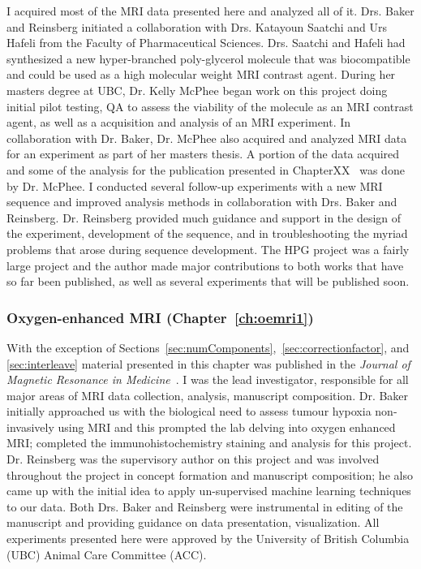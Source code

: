 I acquired most of the MRI data presented here and analyzed all of it.
Drs. Baker and Reinsberg initiated a collaboration with Drs. Katayoun Saatchi and Urs Hafeli from the Faculty of Pharmaceutical Sciences.
Drs. Saatchi and Hafeli had synthesized a new hyper-branched poly-glycerol molecule that was biocompatible and could be used as a high molecular weight MRI contrast agent.
During her masters degree at UBC, Dr. Kelly McPhee began work on this project doing initial pilot testing, QA to assess the viability of the molecule as an MRI contrast agent, as well as a acquisition and analysis of an MRI experiment.
In collaboration with Dr. Baker, Dr. McPhee also acquired and analyzed MRI data for an experiment as part of her masters thesis. 
A portion of the data acquired and some of the analysis for the publication presented in ChapterXX~ was done by Dr. McPhee.
I conducted several follow-up experiments with a new MRI sequence and improved analysis methods in collaboration with Drs. Baker and Reinsberg. 
Dr.  Reinsberg provided much guidance and support in the design of the experiment, development of the sequence, and in troubleshooting the myriad problems that arose during sequence development.
The HPG project was a fairly large project and the author made major contributions to both works that have so far been published, as well as several experiments that will be published soon.

\subsubsection{Oxygen-enhanced MRI (Chapter~\ref{ch:oemri1})}

With the exception of Sections~\ref{sec:numComponents},~\ref{sec:correctionfactor}, and \ref{sec:interleave} material presented in this chapter was published in the \textit{Journal of Magnetic Resonance in Medicine}~\cite{Moosvi:2018ca}. 
I was the lead investigator, responsible for all major areas of MRI data collection, analysis, manuscript composition. 
Dr. Baker initially approached us with the biological need to assess tumour hypoxia non-invasively using MRI and this prompted the lab delving into oxygen enhanced MRI; completed the immunohistochemistry staining and analysis for this project.
Dr. Reinsberg was the supervisory author on this project and was involved throughout the project in concept formation and manuscript composition; he also came up with the initial idea to apply un-supervised machine learning techniques to our data. 
Both Drs. Baker and Reinsberg were instrumental in editing of the manuscript and providing guidance on data presentation, visualization.
All experiments presented here were approved by the University of British Columbia (UBC) Animal Care Committee (ACC).

